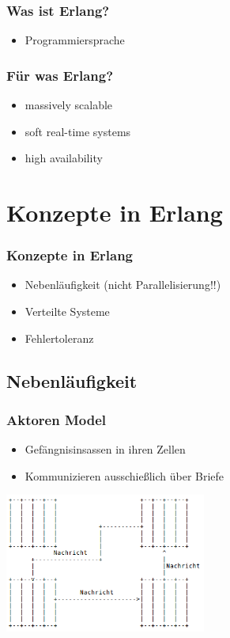 \begin{frame} %
  \frametitle{Was ist Erlang?} %
  \pause
  \begin{itemize}[<+->] %
    \item Programmiersprache
  \end{itemize}
\end{frame}

\begin{frame} %
  \frametitle{Für was Erlang?} %
  \pause
  \begin{itemize}[<+->] %
    \item massively scalable
    \item soft real-time systems
    \item high availability
  \end{itemize}
\end{frame}

\section{Konzepte in Erlang}
\begin{frame} %
  \frametitle{Konzepte in Erlang} %
  \begin{itemize} %
    \item Nebenläufigkeit (nicht Parallelisierung!!)
    \item Verteilte Systeme
    \item Fehlertoleranz
  \end{itemize}
\end{frame}

\subsection{Nebenläufigkeit}
\begin{frame} %
  \frametitle{Aktoren Model} %
  \begin{itemize} %
    \item Gefängnisinsassen in ihren Zellen
    \item Kommunizieren ausschießlich über Briefe
  \end{itemize}
  \includegraphics[width=250px]{img/actoren}
\end{frame}

